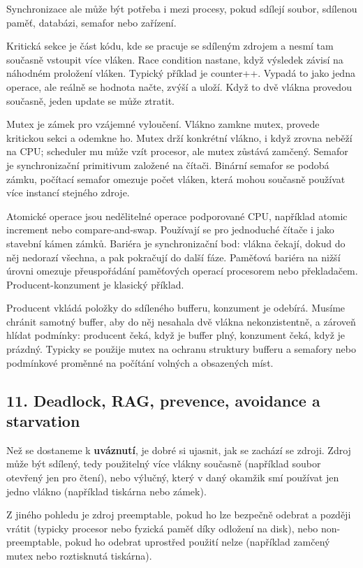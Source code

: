 Synchronizace ale může být potřeba i mezi procesy, pokud sdílejí soubor, sdílenou paměť, databázi, semafor nebo zařízení.

Kritická sekce je část kódu, kde se pracuje se sdíleným zdrojem a nesmí tam současně vstoupit více vláken. Race condition nastane, když výsledek závisí na náhodném proložení vláken. Typický příklad je counter++. Vypadá to jako jedna operace, ale reálně se hodnota načte, zvýší a uloží. Když to dvě vlákna provedou současně, jeden update se může ztratit.

Mutex je zámek pro vzájemné vyloučení. Vlákno zamkne mutex, provede kritickou sekci a odemkne ho. Mutex drží konkrétní vlákno, i když zrovna neběží na CPU; scheduler mu může vzít procesor, ale mutex zůstává zamčený. Semafor je synchronizační primitivum založené na čítači. Binární semafor se podobá zámku, počítací semafor omezuje počet vláken, která mohou současně používat více instancí stejného zdroje.

Atomické operace jsou nedělitelné operace podporované CPU, například atomic increment nebo compare-and-swap. Používají se pro jednoduché čítače i jako stavební kámen zámků. Bariéra je synchronizační bod: vlákna čekají, dokud do něj nedorazí všechna, a pak pokračují do další fáze. Paměťová bariéra na nižší úrovni omezuje přeuspořádání paměťových operací procesorem nebo překladačem. Producent-konzument je klasický příklad.

Producent vkládá položky do sdíleného bufferu, konzument je odebírá. Musíme chránit samotný buffer, aby do něj nesahala dvě vlákna nekonzistentně, a zároveň hlídat podmínky: producent čeká, když je buffer plný, konzument čeká, když je prázdný. Typicky se použije mutex na ochranu struktury bufferu a semafory nebo podmínkové proměnné na počítání volných a obsazených míst.

\subsection*{11. Deadlock, RAG, prevence, avoidance a starvation}

Než se dostaneme k \textbf{uváznutí}, je dobré si ujasnit, jak se zachází se zdroji. Zdroj může být sdílený, tedy použitelný více vlákny současně (například soubor otevřený jen pro čtení), nebo výlučný, který v daný okamžik smí používat jen jedno vlákno (například tiskárna nebo zámek).

Z jiného pohledu je zdroj preemptable, pokud ho lze bezpečně odebrat a později vrátit (typicky procesor nebo fyzická paměť díky odložení na disk), nebo non-preemptable, pokud ho odebrat uprostřed použití nelze (například zamčený mutex nebo roztisknutá tiskárna).

